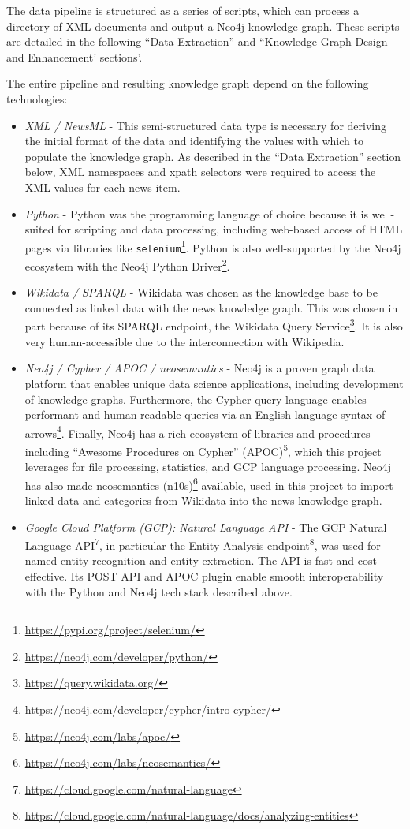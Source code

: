 \documentclass[11pt]{article}
\begin{document}
  The data pipeline is structured as a series of scripts, which can process a directory of XML documents and output a Neo4j knowledge graph. These scripts are detailed in the following ``Data Extraction'' and ``Knowledge Graph Design and Enhancement' sections'.

  The entire pipeline and resulting knowledge graph depend on the following technologies:

  \begin{itemize}
    \item{\textit{XML / NewsML}} - This semi-structured data type is necessary for deriving the initial format of the data and identifying the values with which to populate the knowledge graph. As described in the ``Data Extraction'' section below, XML namespaces and xpath selectors were required to access the XML values for each news item.
    \item{\textit{Python}} - Python was the programming language of choice because it is well-suited for scripting and data processing, including web-based access of HTML pages via libraries like \lstinline{selenium}\footnote{\url{https://pypi.org/project/selenium/}}. Python is also well-supported by the Neo4j ecosystem with the Neo4j Python Driver\footnote{\url{https://neo4j.com/developer/python/}}.
    \item{\textit{Wikidata / SPARQL}} - Wikidata was chosen as the knowledge base to be connected as linked data with the news knowledge graph. This was chosen in part because of its SPARQL endpoint, the Wikidata Query Service\footnote{\url{https://query.wikidata.org/}}. It is also very human-accessible due to the interconnection with Wikipedia.
    \item{\textit{Neo4j / Cypher / APOC / neosemantics}} - Neo4j is a proven graph data platform that enables unique data science applications, including development of knowledge graphs\cite{neo4j-kg-tutorial}. Furthermore, the Cypher query language enables performant and human-readable queries via an English-language syntax of arrows\footnote{\url{https://neo4j.com/developer/cypher/intro-cypher/}}. Finally, Neo4j has a rich ecosystem of libraries and procedures including ``Awesome Procedures on Cypher'' (APOC)\footnote{\url{https://neo4j.com/labs/apoc/}}, which this project leverages for file processing, statistics, and GCP language processing. Neo4j has also made neosemantics (n10s)\footnote{\url{https://neo4j.com/labs/neosemantics/}} available, used in this project to import linked data and categories from Wikidata into the news knowledge graph.
    \item{\textit{Google Cloud Platform (GCP): Natural Language API}} - The GCP Natural Language API\footnote{\url{https://cloud.google.com/natural-language}}, in particular the Entity Analysis endpoint\footnote{\url{https://cloud.google.com/natural-language/docs/analyzing-entities}}, was used for named entity recognition and entity extraction. The API is fast and cost-effective. Its POST API and APOC plugin enable smooth interoperability with the Python and Neo4j tech stack described above.
  \end{itemize}
\end{document}
